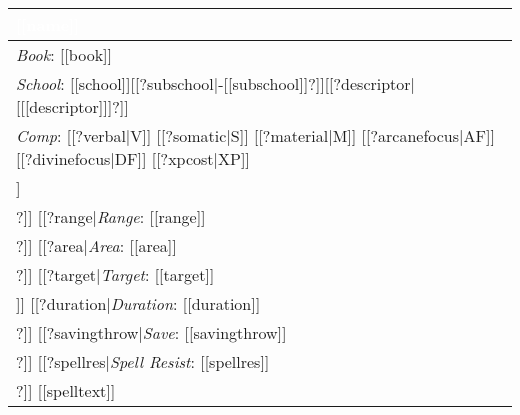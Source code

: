 \noindent
\begin{supertabular}{|p{9cm}|}
\hline
{}\vspace{1mm}\sf\Large\textbf{\textcolor{white}{[[name]]}} \\
\hline
\textit{Book}: [[book]] \\
\hline
\textit{School}: [[school]][[?subschool|-[[subschool]]?]][[?descriptor|[[[descriptor]]]?]]\\
\hline
\textit{Comp}:
[[?verbal|V]]
[[?somatic|S]]
[[?material|M]]
[[?arcanefocus|AF]]
[[?divinefocus|DF]]
[[?xpcost|XP]]
\\
\hline
[[?castingtime|\textit{Casting Time}: [[castingtime]] \\
\hline?]]
[[?range|\textit{Range}: [[range]] \\
\hline?]]
[[?area|\textit{Area}: [[area]] \\
\hline?]]
[[?target|\textit{Target}: [[target]] \\
\hline]]
[[?duration|\textit{Duration}: [[duration]] \\
\hline?]]
[[?savingthrow|\textit{Save}: [[savingthrow]] \\
\hline?]]
[[?spellres|\textit{Spell Resist}: [[spellres]] \\
\hline?]]
[[spelltext]]
\hline
\end{supertabular}

